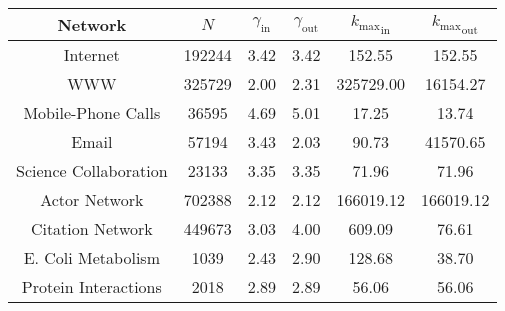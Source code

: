 \begin{tabular}{cccccc}
\toprule\toprule
Network & $N$ & $\gamma_\text{in}$ & $\gamma_\text{out}$ & ${k_{\max}}_\text{in}$ & ${k_{\max}}_\text{out}$ \\
\midrule
Internet & 192244 & 3.42 & 3.42 & 152.55 & 152.55 \\
WWW & 325729 & 2.00 & 2.31 & 325729.00 & 16154.27 \\
Mobile-Phone Calls & 36595 & 4.69 & 5.01 & 17.25 & 13.74 \\
Email & 57194 & 3.43 & 2.03 & 90.73 & 41570.65 \\
Science Collaboration & 23133 & 3.35 & 3.35 & 71.96 & 71.96 \\
Actor Network & 702388 & 2.12 & 2.12 & 166019.12 & 166019.12 \\
Citation Network & 449673 & 3.03 & 4.00 & 609.09 & 76.61 \\
E. Coli Metabolism & 1039 & 2.43 & 2.90 & 128.68 & 38.70 \\
Protein Interactions & 2018 & 2.89 & 2.89 & 56.06 & 56.06 \\
\bottomrule\bottomrule
\end{tabular}
